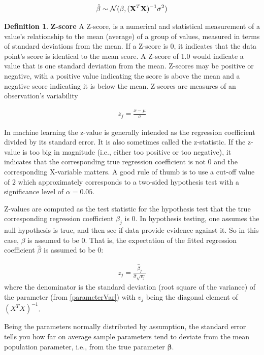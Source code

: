 \documentclass[12pt, letterpaper]{article}
\theoremstyle{definition}
\newtheorem{definition}{Definition}[section]
\newcommand{\X}{\mathrm{\mathbf{X}}}
\newcommand{\be}{\mathbf{\beta}}
\begin{document}
\begin{align}
\label{parameterVar}
\hat{\beta} \sim \CMcal{N}(\beta,  (\X^T\X)^{-1} \sigma^2)
\end{align}

\begin{definition}{\textbf{Z-score}}
A Z-score, is a numerical and statistical measurement of a value's relationship to the mean (average) of a group of values, measured in terms of standard deviations from the mean. If a Z-score is 0, it indicates that the data point's score is identical to the mean score. A Z-score of 1.0 would indicate a value that is one standard deviation from the mean. Z-scores may be positive or negative, with a positive value indicating the score is above the mean and a negative score indicating it is below the mean. Z-scores are measures of an observation's variability

\begin{align}
z_j=\frac{x - \mu}{\sigma}
\end{align}

In machine learning the z-value is generally intended as the regression coefficient divided by its standard error. It is also sometimes called the z-statistic. If the z-value is too big in magnitude (i.e., either too positive or too negative), it indicates that the corresponding true regression coefficient is not $0$ and the corresponding X-variable matters. A good rule of thumb is to use a cut-off value of $2$ which approximately corresponds to a two-sided hypothesis test with a significance level of $\alpha=0.05$.

Z-values are computed as the test statistic for the hypothesis test that the true corresponding regression coefficient $\beta_j$ is $0$. In hypothesis testing, one assumes the null hypothesis is true, and then see if data provide evidence against it. So in this case, $\beta$ is assumed to be  $0$. That is, the expectation of the fitted regression coefficient $\hat{\beta}$ is assumed to be $0$:

\begin{align}
z_j =\frac{\hat{\beta}_j}{\hat{\sigma} \sqrt{v_j}}
\end{align}
where the denominator is the standard deviation (root square of the variance) of the parameter (from \autoref{parameterVar}) with $v_j$ being the diagonal element of $(X^TX)^{-1}$.
\end{definition}

Being the parameters normally distributed by assumption, the standard error tells you how far on average sample parameters tend to deviate from the mean population parameter, i.e., from the true parameter $\be$.
\end{document}

